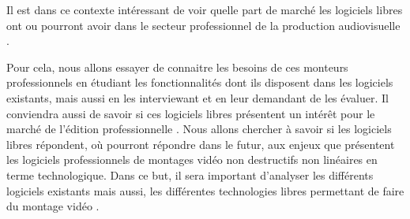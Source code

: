 Il est dans ce contexte intéressant de voir quelle part de marché les
logiciels libres ont ou pourront avoir dans le secteur professionnel de
la production audiovisuelle .

Pour cela, nous allons essayer de connaitre les besoins de ces monteurs
professionnels en étudiant les fonctionnalités dont ils disposent
dans les logiciels existants, mais aussi en les interviewant et en
leur demandant de les évaluer.  Il conviendra aussi de savoir si ces
logiciels libres présentent un intérêt pour le marché de l'édition
professionnelle . Nous allons chercher à savoir si les logiciels
libres répondent, où pourront répondre dans le futur, aux enjeux
que présentent les logiciels professionnels de montages vidéo non
destructifs non linéaires en terme technologique. Dans ce but, il sera
important d'analyser les différents logiciels existants mais aussi, les
différentes technologies libres permettant de faire du montage vidéo .
